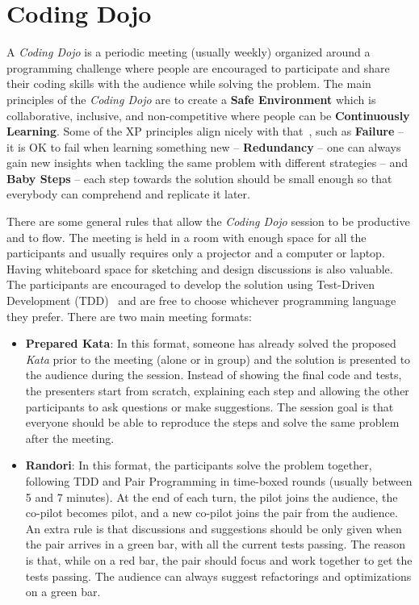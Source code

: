 \section{Coding Dojo}\label{sec:dojo}

A \emph{Coding Dojo} is a periodic meeting (usually weekly) organized around a programming challenge
where people are encouraged to participate and share their coding skills with the audience while
solving the problem. The main principles of the \emph{Coding Dojo} are to create a
\textbf{Safe Environment} which is collaborative, inclusive, and non-competitive where people can
be \textbf{Continuously Learning}. Some of the XP principles align nicely with that~\cite{XP2E}, such
as \textbf{Failure} -- it is OK to fail when learning something new -- \textbf{Redundancy} -- one can
always gain new insights when tackling the same problem with different strategies -- and
\textbf{Baby Steps} -- each step towards the solution should be small enough so that everybody can
comprehend and replicate it later.

There are some general rules that allow the \emph{Coding Dojo} session to be productive and to flow.
The meeting is held in a room with enough space for all the participants and usually requires only a
projector and a computer or laptop. Having whiteboard space for sketching and design discussions is also
valuable. The participants are encouraged to develop the solution using Test-Driven Development
(TDD)~\cite{TDD} and are free to choose whichever programming language they prefer. There are two main
meeting formats:

\begin{itemize}
	\item \textbf{Prepared Kata}: In this format, someone has already solved the proposed \emph{Kata}
	prior to the meeting (alone or in group) and the solution is presented to the audience during the session.
	Instead of showing the final code and tests, the presenters start from scratch, explaining each step
	and allowing the other participants to ask questions or make suggestions. The session goal is that
	everyone should be able to reproduce the steps and solve the same problem after the meeting.
	
	\item \textbf{Randori}: In this format, the participants solve the problem together, following TDD and
	Pair Programming in time-boxed rounds (usually between 5 and 7 minutes). At the end of each turn, the
	pilot joins the audience, the co-pilot becomes pilot, and a new co-pilot joins the pair from the
	audience. An extra rule is that discussions and suggestions should be only given when the pair arrives
	in a green bar, with all the current tests passing. The reason is that, while on a red bar, the pair should
	focus and work together to get the tests passing. The audience can always suggest refactorings and
	optimizations on a green bar.
\end{itemize}


